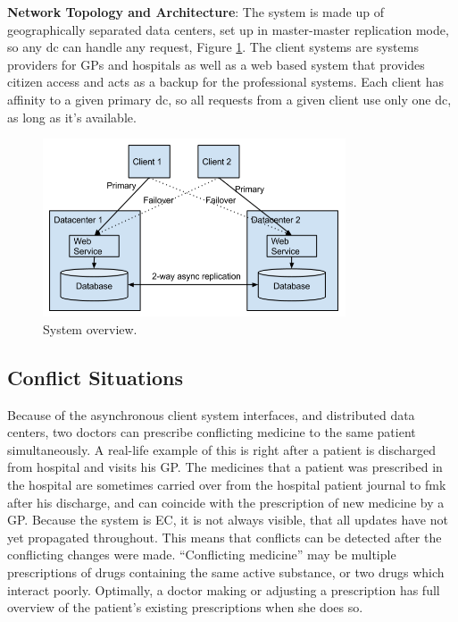 \documentclass[11pt,a4paper]{report}
\begin{document}
{\bf Network Topology and Architecture}: 
The system is made up of geographically separated data centers, set up in master-master replication mode, so any \gls{dc} can handle any request, Figure \ref{fig:system_overview}.
The client systems are systems providers for GPs and hospitals as well as a web based system that provides citizen access and acts as a backup for the professional systems.
Each client has affinity to a given primary \gls{dc}, so all requests from a given client use only one \gls{dc}, as long as it's available.
\begin{figure}[!h]
	\centering
	\includegraphics[width=0.8\textwidth]{./img/image3.png}

	\caption{System overview.}
	\label{fig:system_overview}
\end{figure}


\subsection{Conflict Situations}
Because of the asynchronous client system interfaces, and distributed data centers, two doctors can prescribe conflicting medicine to the same patient simultaneously. A real-life example of this is right after a patient is discharged from hospital and visits his GP. The medicines that a patient was prescribed in the hospital are sometimes carried over from the hospital patient journal to \gls{fmk} after his discharge, and can coincide with the prescription of new medicine by a GP.
Because the system is EC, it is not always visible, that all updates have not yet propagated throughout. This means that conflicts can be detected after the conflicting changes were made.
``Conflicting medicine'' may be multiple prescriptions of drugs containing the same active substance, or two drugs which interact poorly. Optimally, a doctor making or adjusting a prescription has full overview of the patient's existing prescriptions when she does so.
\end{document}
